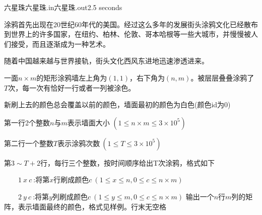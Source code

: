 \begin{problem}{六星珠}{六星珠.in}{六星珠.out}{2.5 seconds}


涂鸦首先出现在20世纪60年代的美国。经过这么多年的发展街头涂鸦文化已经散布到世界上的许多国家，在纽约、柏林、伦敦、哥本哈根等一些大城市，并慢慢被人们接受，而且逐渐成为一种艺术。

随着中国越来越与世界接轨，街头文化西风东进地迅速渗透进来。

一面$n\times m$的矩形涂鸦墙左上角为$(1,1)$，右下角为$(n,m)$。被层层叠叠涂鸦了$T$次，每一次有恰好一行或者一列被涂色。

新刷上去的颜色总会覆盖以前的颜色，墙面最初的颜色为白色(颜色id为0)

\InputFile
第一行2个整数$n$与$m$表示墙面大小 $(1\le n\times m\le 3\times 10^5)$

第二行一个整数$T$表示涂鸦次数$\ (1\le T\le 3\times 10^5)$

第$3\sim T+2$行，每行三个整数，按时间顺序给出T次涂鸦，格式如下

$\quad\quad 1\ x\ c\ $:将第$x$行刷成颜色$c\ (1\le x\le n,0\le c\le n\times m)$

$\quad\quad 2\ y\ c\ $:将第$y$列刷成颜色$c\ (1\le y\le m,0\le c\le n\times m)$
\OutputFile
输出一个$n$行$m$列的矩阵，表示墙面最终的颜色，格式见样例。行末无空格

\Example
\begin{example}
%
\end{example}
\\

\end{problem}

